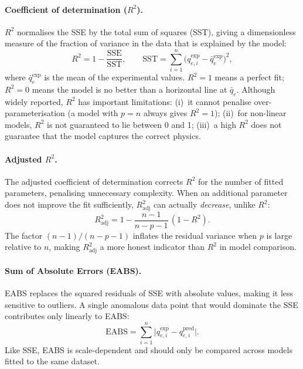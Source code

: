 	\paragraph{Coefficient of determination ($R^{2}$).}
	$R^{2}$ normalises the SSE by the total sum of squares (SST),
	giving a dimensionless measure of the fraction of variance in the
	data that is explained by the model:
	\begin{equation}
		R^{2} = 1 - \frac{\mathrm{SSE}}{\mathrm{SST}},
		\qquad
		\mathrm{SST} = \sum_{i=1}^{n}
		\bigl(q_{e,i}^{\exp} - \bar{q}_e^{\exp}\bigr)^{2},
		\label{eq:R2}
	\end{equation}
	where $\bar{q}_e^{\exp}$ is the mean of the experimental values.
	$R^{2} = 1$ means a perfect fit; $R^{2} = 0$ means the model
	is no better than a horizontal line at $\bar{q}_e$. Although
	widely reported, $R^{2}$ has important limitations: (i)~it cannot
	penalise over-parameterisation (a model with $p = n$ always
	gives $R^{2} = 1$); (ii)~for non-linear models, $R^{2}$ is not
	guaranteed to lie between 0 and 1; (iii)~a high $R^{2}$ does not
	guarantee that the model captures the correct physics.

	\paragraph{Adjusted $R^{2}$.}
	The adjusted coefficient of determination corrects $R^{2}$ for
	the number of fitted parameters, penalising unnecessary complexity.
	When an additional parameter does not improve the fit sufficiently,
	$R^{2}_{\mathrm{adj}}$ can actually \emph{decrease}, unlike
	$R^{2}$:
	\begin{equation}
		R_{\mathrm{adj}}^{2}
		= 1 - \frac{n - 1}{n - p - 1}\,(1 - R^{2}).
		\label{eq:R2adj}
	\end{equation}
	The factor $(n-1)/(n-p-1)$ inflates the residual variance when
	$p$ is large relative to $n$, making $R^{2}_{\mathrm{adj}}$ a
	more honest indicator than $R^{2}$ in model comparison.

	\paragraph{Sum of Absolute Errors (EABS).}
	EABS replaces the squared residuals of SSE with absolute values,
	making it less sensitive to outliers. A single anomalous data
	point that would dominate the SSE contributes only linearly to
	EABS:
	\begin{equation}
		\mathrm{EABS}
		= \sum_{i=1}^{n}
		\bigl|q_{e,i}^{\exp} - q_{e,i}^{\mathrm{pred}}\bigr|.
		\label{eq:EABS}
	\end{equation}
	Like SSE, EABS is scale-dependent and should only be compared
	across models fitted to the same dataset.

